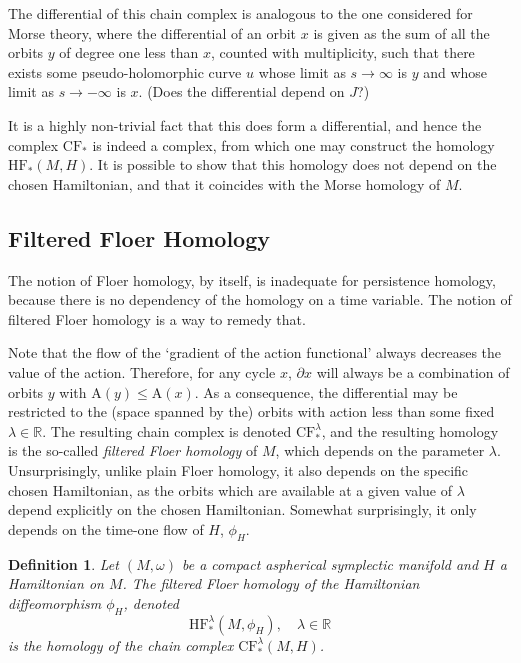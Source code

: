 \documentclass{article}
\newtheorem{definition}{Definition}
\theoremstyle{nonumberplain}
\newcommand{\R}{\mathbb{R}}
\renewcommand{\AA}{\mathrm{A}}
\newcommand{\CF}{\mathrm{CF}}
\newcommand{\HF}{\mathrm{HF}}
\begin{document}
The differential of this chain complex is analogous to the one considered for Morse theory, where the differential of an orbit $x$ is given as the sum of all the orbits $y$ of degree one less than $x$, counted with multiplicity, such that there exists some pseudo-holomorphic curve $u$ whose limit as $s \to \infty$ is $y$ and whose limit as $s \to -\infty$ is $x$. (Does the differential depend on $J$?)

It is a highly non-trivial fact that this does form a differential, and hence the complex $\CF_*$ is indeed a complex, from which one may construct the homology $\HF_*(M,H)$. It is possible to show that this homology does not depend on the chosen Hamiltonian, and that it coincides with the Morse homology of $M$.

\subsection{Filtered Floer Homology}

The notion of Floer homology, by itself, is inadequate for persistence homology, because there is no dependency of the homology on a time variable. The notion of filtered Floer homology is a way to remedy that.

Note that the flow of the `gradient of the action functional' always decreases the value of the action. Therefore, for any cycle $x$, $\partial x$ will always be a combination of orbits $y$ with $\AA(y) \leq \AA(x)$. As a consequence, the differential may be restricted to the (space spanned by the) orbits with action less than some fixed $\lambda \in \R$. The resulting chain complex is denoted $\CF_*^\lambda$, and the resulting homology is the so-called \emph{filtered Floer homology} of $M$, which depends on the parameter $\lambda$. Unsurprisingly, unlike plain Floer homology, it also depends on the specific chosen Hamiltonian, as the orbits which are available at a given value of $\lambda$ depend explicitly on the chosen Hamiltonian. Somewhat surprisingly, it only depends on the time-one flow of $H$, $\phi_H$.

\begin{definition}
Let $(M,\omega)$ be a compact aspherical symplectic manifold and $H$ a Hamiltonian on $M$. The \emph{filtered Floer homology} of the Hamiltonian diffeomorphism $\phi_H$, denoted
\begin{equation}
\HF^\lambda_*(M,\phi_H), \quad \lambda \in \R
\end{equation}
is the homology of the chain complex $\CF^\lambda_*(M,H)$.
\end{definition}
\end{document}
